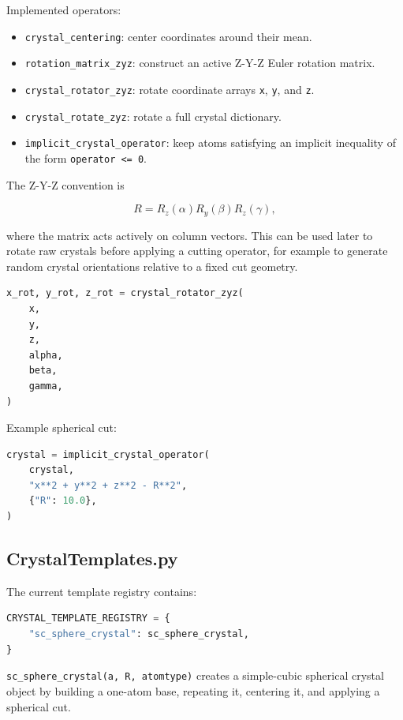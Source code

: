 \documentclass[11pt,a4paper]{article}
\begin{document}
Implemented operators:

\begin{itemize}[nosep]
    \item \texttt{crystal\_centering}: center coordinates around their mean.
    \item \texttt{rotation\_matrix\_zyz}: construct an active Z-Y-Z Euler
    rotation matrix.
    \item \texttt{crystal\_rotator\_zyz}: rotate coordinate arrays
    \texttt{x}, \texttt{y}, and \texttt{z}.
    \item \texttt{crystal\_rotate\_zyz}: rotate a full crystal dictionary.
    \item \texttt{implicit\_crystal\_operator}: keep atoms satisfying an
    implicit inequality of the form \texttt{operator <= 0}.
\end{itemize}

The Z-Y-Z convention is

\[
    R = R_z(\alpha) R_y(\beta) R_z(\gamma),
\]

where the matrix acts actively on column vectors. This can be used later to
rotate raw crystals before applying a cutting operator, for example to generate
random crystal orientations relative to a fixed cut geometry.

\begin{lstlisting}[language=Python]
x_rot, y_rot, z_rot = crystal_rotator_zyz(
    x,
    y,
    z,
    alpha,
    beta,
    gamma,
)
\end{lstlisting}

Example spherical cut:

\begin{lstlisting}[language=Python]
crystal = implicit_crystal_operator(
    crystal,
    "x**2 + y**2 + z**2 - R**2",
    {"R": 10.0},
)
\end{lstlisting}

\subsection{CrystalTemplates.py}

The current template registry contains:

\begin{lstlisting}[language=Python]
CRYSTAL_TEMPLATE_REGISTRY = {
    "sc_sphere_crystal": sc_sphere_crystal,
}
\end{lstlisting}

\texttt{sc\_sphere\_crystal(a, R, atomtype)} creates a simple-cubic spherical
crystal object by building a one-atom base, repeating it, centering it, and
applying a spherical cut.
\end{document}
